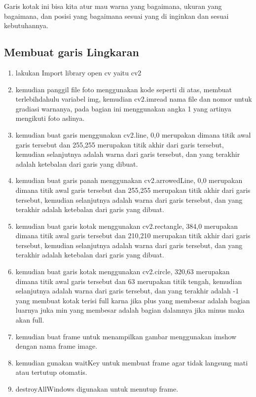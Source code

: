 Garis kotak ini bisa kita atur mau warna yang bagaimana, ukuran yang bagaimana, dan posisi yang bagaimana sesuai yang di inginkan dan sesuai kebutuhannya.

\newpage
\subsection{Membuat garis Lingkaran}

\begin{enumerate}
	\item lakukan Import library open cv yaitu cv2
	\item kemudian panggil file foto menggunakan kode seperti di atas, membuat terlebihdahulu variabel img, kemudian cv2.imread nama file dan nomor untuk gradiasi warnanya, pada bagian ini menggunakan angka 1 yang artinya mengikuti foto aslinya.
	\item kemudian buat garis menggunakan cv2.line, 0,0 merupakan dimana titik awal garis tersebut dan 255,255 merupakan titik akhir dari garis tersebut, kemudian selanjutnya adalah warna dari garis tersebut, dan yang terakhir adalah ketebalan dari garis yang dibuat.
	\item kemudian buat garis panah menggunakan cv2.arrowedLine, 0,0 merupakan dimana titik awal garis tersebut dan 255,255 merupakan titik akhir dari garis tersebut, kemudian selanjutnya adalah warna dari garis tersebut, dan yang terakhir adalah ketebalan dari garis yang dibuat.
	\item kemudian buat garis kotak menggunakan cv2.rectangle, 384,0 merupakan dimana titik awal garis tersebut dan 210,210 merupakan titik akhir dari garis tersebut, kemudian selanjutnya adalah warna dari garis tersebut, dan yang terakhir adalah ketebalan dari garis yang dibuat.
	\item kemudian buat garis kotak menggunakan cv2.circle, 320,63 merupakan dimana titik awal garis tersebut dan 63 merupakan titik tengah, kemudian selanjutnya adalah warna dari garis tersebut, dan yang terakhir adalah -1 yang membuat kotak terisi full karna jika plus yang membesar adalah bagian luarnya juka min yang membesar adalah bagian dalamnya jika minus maka akan full.
	\item kemudian buat frame untuk menampilkan gambar menggunakan imshow dengan nama frame image.
	\item kemudian gunakan waitKey untuk membuat frame agar tidak langsung mati atau tertutup otomatis.
	\item destroyAllWindows digunakan untuk menutup frame.
\end{enumerate}

